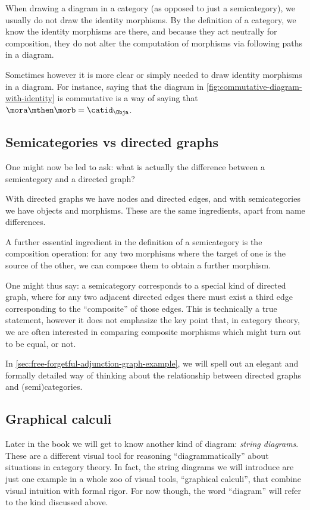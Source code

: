 \begin{remark}
When drawing a diagram in a category (as opposed to just a semicategory), we usually do not draw the identity morphisms. By the definition of a category, we know the identity morphisms are there, and because they act neutrally for composition, they do not alter the computation of morphisms via following paths in a diagram. 

Sometimes however it is more clear or simply needed to draw identity morphisms in a diagram. For instance, saying that the diagram in \cref{fig:commutative-diagram-with-identity} is commutative is a way of saying that $\mora \mthen \morb = \catid_{\Obja}$. 
\end{remark}



\subsection{Semicategories vs directed graphs}

One might now be led to ask: what is actually the difference between a semicategory and a directed graph?

With directed graphs we have nodes and directed edges, and with semicategories we have objects and morphisms. These are the same ingredients, apart from name differences.

A further essential ingredient in the definition of a semicategory is the composition operation: for any two morphisms where the target of one is the source of the other, we can compose them to obtain a further morphism. 

One might thus say: a semicategory corresponds to a special kind of directed graph, where for any two adjacent directed edges there must exist a third edge corresponding to the ``composite'' of those edges.
This is technically a true statement, however it does not emphasize the key point that, in category theory, we are often interested in comparing composite morphisms which might turn out to be equal, or not. 

In \cref{sec:free-forgetful-adjunction-graph-example}, we will spell out an elegant and formally detailed way of thinking about the relationship between directed graphs and (semi)categories. 

\subsection{Graphical calculi}


Later in the book we will get to know another kind of diagram: \emph{string diagrams}. These are a different visual tool for reasoning ``diagrammatically'' about situations in category theory. In fact, the string diagrams we will introduce are just one example in a whole zoo of visual tools, ``graphical calculi'', that combine visual intuition with formal rigor. For now though, the word ``diagram'' will refer to the kind discussed above. 

